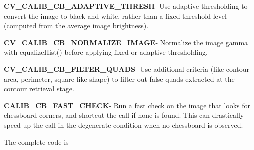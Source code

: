 \documentclass[]{article}
\begin{document}
\textbf{CV\_CALIB\_CB\_ADAPTIVE\_THRESH}- Use adaptive thresholding to
convert the image to black and white, rather than a fixed threshold
level (computed from the average image brightness).

\textbf{CV\_CALIB\_CB\_NORMALIZE\_IMAGE}- Normalize the image gamma with
equalizeHist() before applying fixed or adaptive thresholding.

\textbf{CV\_CALIB\_CB\_FILTER\_QUADS}- Use additional criteria (like
contour area, perimeter, square-like shape) to filter out false quads
extracted at the contour retrieval stage.

\textbf{CALIB\_CB\_FAST\_CHECK}- Run a fast check on the image that
looks for chessboard corners, and shortcut the call if none is found.
This can drastically speed up the call in the degenerate condition when
no chessboard is observed.

The complete code is -
\end{document}
